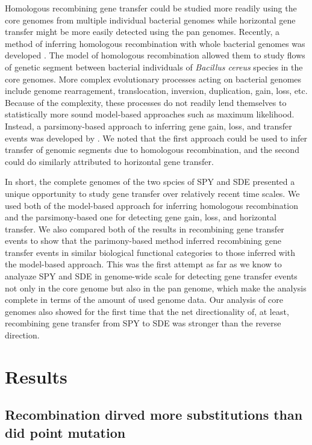 \documentclass[english]{article}
\begin{document}
Homologous recombining gene transfer could be studied more readily using the
core genomes from multiple individual bacterial genomes while horizontal gene
transfer might be more easily detected using the pan genomes. Recently, a method
of inferring homologous recombination with whole bacterial genomes was developed
\citep{Didelot2010}. The model of homologous recombination allowed them to study
flows of genetic segment between bacterial individuals of \textit{Bacillus
cereus} species in the core genomes.  More complex evolutionary processes acting
on bacterial genomes include genome rearragement, translocation, inversion,
duplication, gain, loss, etc.  Because of the complexity, these processes do not
readily lend themselves to statistically more sound model-based approaches such
as maximum likelihood. Instead, a parsimony-based approach to inferring gene
gain, loss, and transfer events was developed by  \citep{Doyon2011}.  We noted
that the first approach could be used to infer transfer of genomic segments due
to homologous recombination, and the second could do similarly attributed to
horizontal gene transfer. 

In short, the complete genomes of the two spcies of SPY and SDE presented a
unique opportunity to study gene transfer over relatively recent time scales.
We used both of the model-based approach for inferring homologous recombination
and the parsimony-based one for detecting gene gain, loss, and horizontal
transfer. We also compared both of the results in recombining gene transfer
events to show that the parimony-based method inferred recombining gene transfer
events in similar biological functional categories to those inferred with the
model-based approach. This was the first attempt as far as we know to analyaze
SPY and SDE in genome-wide scale for detecting gene transfer events not only in
the core genome but also in the pan genome, which make the analysis complete in
terms of the amount of used genome data. Our analysis of core genomes also
showed for the first time that the net directionality of, at least, recombining
gene transfer from SPY to SDE was stronger than the reverse direction.

\clearpage{}

\section{Results}

\subsection{Recombination dirved more substitutions than did point mutation}
\end{document}

